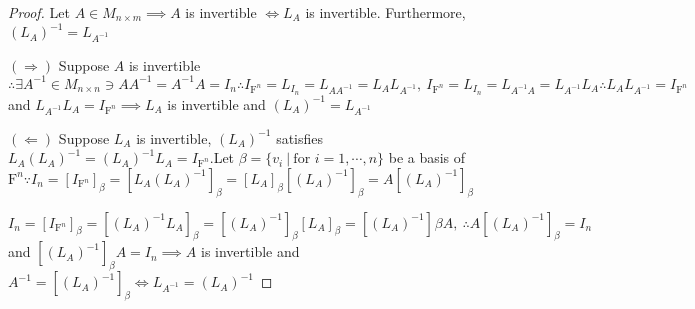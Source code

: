 \begin{proof}
	Let $A \in M_{n \times m} \implies A$ is invertible $\Leftrightarrow L_A$ is invertible. Furthermore, $(L_A)^{-1} = L_{A^{-1}}$
	
	$(\Rightarrow)$ Suppose $A$ is invertible $\therefore \exists A^{-1} \in M_{n \times n} \ni AA^{-1} = A^{-1}A = I_n \therefore I_{\mathrm{F}^n} = L_{I_n} = L_{AA^{-1}} = L_AL_{A^{-1}},~ I_{\mathrm{F}^n} = L_{I_n} = L_{A^{-1}A} = L_{A^{-1}}L_A \therefore L_AL_{A^{-1}} = I_{\mathrm{F}^n}$ and $L_{A^{-1}}L_{A} = I_{\mathrm{F}^n} \implies L_A$ is invertible and $(L_A)^{-1} = L_{A^{-1}}$

	$(\Leftarrow)$ Suppose $L_A$ is invertible, $(L_A)^{-1}$ satisfies $L_A(L_A)^{-1} = (L_A)^{-1}L_{A} = I_{\mathrm{F}^n}$.Let $\beta = \{v_i ~|~ \text{for }i = 1,\cdots,n \}$ be a basis of $\mathrm{F}^n \because I_n = [I_{\mathrm{F}^n}]_{\beta} = [L_A(L_A)^{-1}]_{\beta} = [L_A]_{\beta}[(L_A)^{-1}]_{\beta} = A[(L_A)^{-1}]_{\beta}$
	
	$I_n = [I_{\mathrm{F}^n}]_{\beta} = [(L_A)^{-1}L_A]_{\beta} = [(L_A)^{-1}]_{\beta}[L_A]_{\beta} = [(L_A)^{-1}]_{}\beta A ,~ \therefore A[(L_A)^{-1}]_{\beta} = I_n$ and $[(L_A)^{-1}]_{\beta}A = I_n \implies A$ is invertible and $A^{-1} = [(L_A)^{-1}]_{\beta} \Leftrightarrow L_{A^{-1}} = (L_A)^{-1}$
\end{proof}
